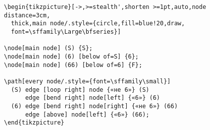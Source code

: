 \documentclass[12pt]{article}
\begin{document}
\begin{verbatim}
\begin{tikzpicture}[->,>=stealth',shorten >=1pt,auto,node distance=3cm,
  thick,main node/.style={circle,fill=blue!20,draw,
  font=\sffamily\Large\bfseries}]

\node[main node] (S) {S};
\node[main node] (6) [below of=S] {6};
\node[main node] (66) [below of=6] {F};

\path[every node/.style={font=\sffamily\small}]
  (S) edge [loop right] node {«не 6»} (S)
      edge [bend right] node[left] {«6»} (6)
  (6) edge [bend right] node[right] {«не 6»} (66)
      edge [above] node[left] {«6»} (66);
\end{tikzpicture}      
\end{verbatim}
\end{document}
